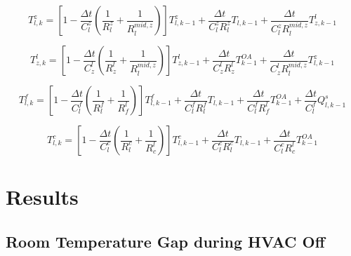 \begin{equation}\label{eq:app_tlz}
T^{z}_{l,k} = 
\left[ 1 - \frac{\Delta t}{C_l^{z}} (\frac{1}{{R}^{z}_l} +  \frac{1}{R^{mid,z}_l} )  \right] T^{z}_{l,k-1} + 
\frac{\Delta t}{{C_l^{z}}{R^{z}_l}} T_{l,k-1} + 
\frac{\Delta t}{{C_l^{z}}{R^{mid,z}_l}} T^{l}_{z,k-1} 
\end{equation}

\begin{equation}\label{eq:app_tzl}
T^{l}_{z,k} = 
\left[ 1 - \frac{\Delta t}{C_z^{l}} (\frac{1}{{R}^{l}_z} +  \frac{1}{R^{mid,z}_l} )  \right] T^{l}_{z,k-1} + 
\frac{\Delta t}{{C_z^{l}}{R^{l}_z}} T^{OA}_{k-1} + 
\frac{\Delta t}{{C_z^{l}}{R^{mid,z}_l}} T^{z}_{l,k-1} 
\end{equation}

\begin{equation}\label{eq:app_tlf}
T^{f}_{l,k} = 
\left[ 1 - \frac{\Delta t}{C_l^{f}} (\frac{1}{{R}^{f}_l} +  \frac{1}{R^{l}_f} )  \right] T^{f}_{l,k-1} + 
\frac{\Delta t}{{C_l^{f}}{R^{f}_l}} T_{l,k-1} + 
\frac{\Delta t}{{C_l^{f}}{R^{l}_f}} T^{OA}_{k-1} +
\frac{\Delta t}{{C_l^{f}}} Q^{s}_{l,k-1}
\end{equation}

\begin{equation}\label{eq:app_tlc}
T^{c}_{l,k} = 
\left[ 1 - \frac{\Delta t}{C_l^{c}} (\frac{1}{{R}^{c}_l} +  \frac{1}{R^{l}_c})  \right] T^{c}_{l,k-1} + 
\frac{\Delta t}{{C_l^{c}}{R^{c}_l}} T_{l,k-1} + 
\frac{\Delta t}{{C_l^{c}}{R^{l}_c}} T^{OA}_{k-1} 
\end{equation}


\section{Results}

\subsection{Room Temperature Gap during HVAC Off}

